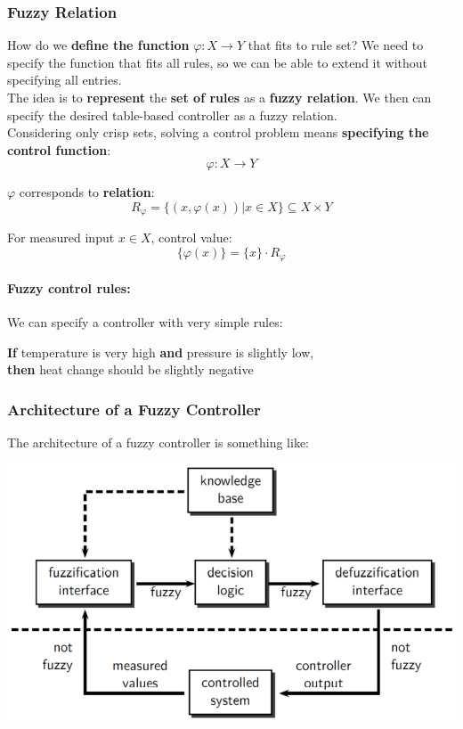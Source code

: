 \newpage

\subsubsection{Fuzzy Relation}

How do we \textbf{define the function} $\varphi: X \rightarrow Y$ that fits to rule set? We need to specify the function that fits all rules, so we can be able to extend it without specifying all entries.\\

The idea is to \textbf{represent} the \textbf{set of rules} as a \textbf{fuzzy relation}. We then can specify the desired table-based controller as a fuzzy relation.\\

Considering only crisp sets, solving a control problem means \textbf{specifying the control function}: 
$$ \varphi : X \rightarrow Y $$

$\varphi$ corresponds to \textbf{relation}:
$$ R_{\varphi} = \{(x, \varphi(x)) | x \in X \} \subseteq X \times Y $$

For measured input $x \in X$, control value: 
$$ \{\varphi(x)\} = \{x\} \cdot R_{\varphi} $$

\nn

\paragraph{Fuzzy control rules:} We can specify a controller with very simple rules:
\begin{center}
	\textbf{If} temperature is very high \textbf{and} pressure is slightly low, \\
	\textbf{then} heat change should be slightly negative
\end{center}

\newpage

\subsubsection{Architecture of a Fuzzy Controller}

The architecture of a fuzzy controller is something like: 
\begin{center}
	\includegraphics[width=0.7\columnwidth]{img/FS/fuzzycontroller}
\end{center}

